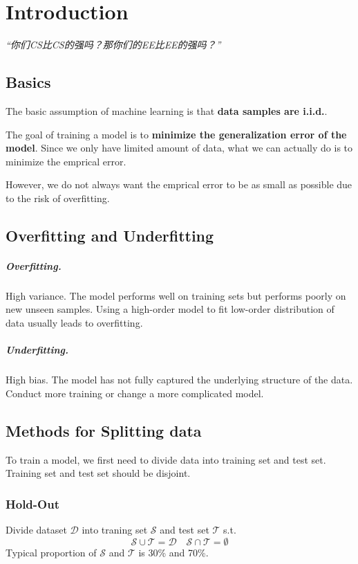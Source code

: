 \chapter{Introduction}
\emph{“你们CS比CS的强吗？那你们的EE比EE的强吗？”}
\newpage

\section{Basics}
The basic assumption of machine learning is that \textbf{data samples are i.i.d.}.

The goal of training a model is to \textbf{minimize the generalization error of the model}. Since we only have limited amount of data, what we can actually do is to minimize the emprical error.

However, we do not always want the emprical error to be as small as possible due to the risk of overfitting.

\section{Overfitting and Underfitting}
\paragraph{Overfitting.} High variance. The model performs well on training sets but performs poorly on new unseen samples. Using a high-order model to fit low-order distribution of data usually leads to overfitting.
\paragraph{Underfitting.} High bias. The model has not fully captured the underlying structure of the data. Conduct more training or change a more complicated model.

\section{Methods for Splitting data}
To train a model, we first need to divide data into training set and test set. Training set and test set should be disjoint.

\subsection{Hold-Out}
Divide dataset $\mathcal{D}$ into traning set $\mathcal{S}$ and test set $\mathcal{T}$ s.t.
\[ \mathcal{S} \cup \mathcal{T} = \mathcal{D} \quad \mathcal{S} \cap \mathcal{T} = \emptyset \]
Typical proportion of $\mathcal{S}$ and $\mathcal{T}$ is 30\% and 70\%.

